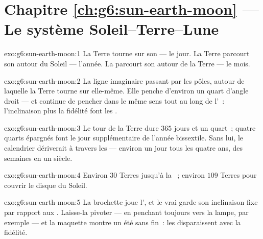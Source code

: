 \section*{Chapitre \ref{ch:g6:sun-earth-moon} --- Le système Soleil--Terre--Lune}

\begin{solution}{exo:g6:sun-earth-moon:1}
La Terre tourne sur son  --- le jour. La Terre parcourt son 
autour du Soleil --- l'année. La  parcourt son  autour de
la Terre --- le mois.
\end{solution}

\begin{solution}{exo:g6:sun-earth-moon:2}
La ligne imaginaire passant par les pôles, autour de laquelle la
Terre tourne sur elle-même. Elle penche d'environ un quart d'angle
droit --- et continue de pencher dans le même sens tout au long de
l'~: l'inclinaison plus la fidélité font les .
\end{solution}

\begin{solution}{exo:g6:sun-earth-moon:3}
Le tour de la Terre dure $365$ jours et un quart~; quatre quarts
épargnés font le jour supplémentaire de l'année bissextile. Sans lui,
le calendrier dériverait à travers les  --- environ un jour
tous les quatre ans, des semaines en un siècle.
\end{solution}

\begin{solution}{exo:g6:sun-earth-moon:4}
Environ $30$ Terres jusqu'à la ~; environ $109$ Terres pour
couvrir le disque du Soleil.
\end{solution}

\begin{solution}{exo:g6:sun-earth-moon:5}
La brochette joue l', et le vrai  garde son inclinaison fixe
par rapport aux . Laisse-la pivoter --- en penchant toujours
vers la lampe, par exemple --- et la maquette montre un été sans
fin~: les  disparaissent avec la fidélité.
\end{solution}

